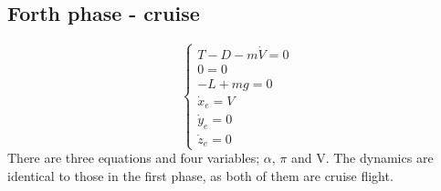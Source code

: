 \subsection*{Forth phase - cruise}
\begin{equation}
	\begin{cases}
		T - D -m\dot{V}=0\\
		0=0\\
		-L+mg=0\\
		\dot{x}_e=V\\
		\dot{y}_e=0\\
		\dot{z}_e=0
	\end{cases}
\end{equation}
There are three equations and four variables; $\alpha$, $\pi$ and V. The dynamics are identical to those in the first phase, as both of them are cruise flight.